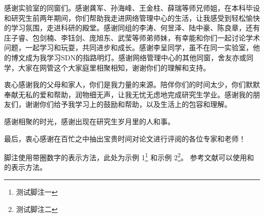 \begin{acknowledgement}
感谢实验室的同窗们。感谢龚军、孙海峰、王金柱、薛瑞等师兄师姐，在本科毕设和研究生前两年期间，你们帮助我走进网络管理中心的生活，让我感受到轻松愉快的学习氛围，走进科研的殿堂。感谢同组的李涛、何昱泽、陆中豪、陈良章，还有庄子睿、包剑楠、李钰剑、庞旭东、武莹等师弟师妹，有幸能和你们一起讨论学术问题，一起学习和玩耍，共同进步和成长。感谢李呈同学，虽不在同一实验室，他的博文成为我学习SDN的指路明灯。感谢网络管理中心的其他同窗，舍友亦或同学，大家在网管这个大家庭里相聚相知，谢谢你们的理解和支持。

衷心感谢我的父母和家人，你们是我力量的来源。陪伴你们的时间太少，你们默默奉献无私的爱和帮助，润物细无声，让我无忧无虑地完成研究生学业。感谢我的朋友们，谢谢你们给予我学习上的鼓励和帮助，以及生活上的包容和理解。

感谢相聚的时光，感谢出现在研究生岁月里的人和事。

最后，衷心感谢在百忙之中抽出宝贵时间对论文进行评阅的各位专家和老师！


脚注使用带圈数字的表示方法，此处为示例 1\footnote{测试脚注一} 和示例 2\footnote{测试脚注二}。
参考文献可以使用\cite{BUPT_Thesis_Format_2014}和的表示方法。

\end{acknowledgement}
